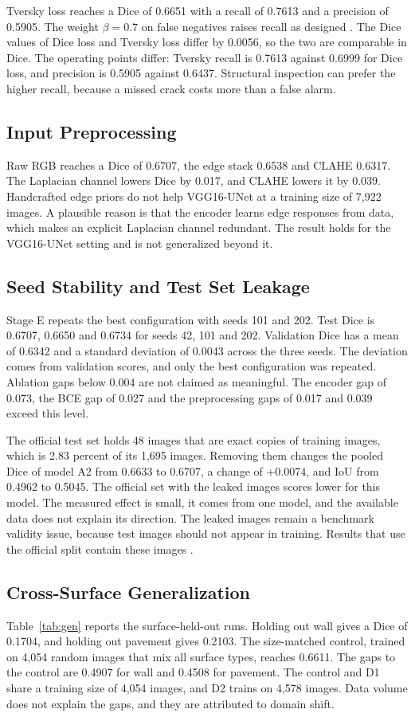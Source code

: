 \documentclass[conference]{IEEEtran}
\begin{document}
Tversky loss reaches a Dice of 0.6651 with a recall of 0.7613 and a precision of 0.5905. The weight $\beta=0.7$ on false negatives raises recall as designed \cite{tversky}. The Dice values of Dice loss and Tversky loss differ by 0.0056, so the two are comparable in Dice. The operating points differ: Tversky recall is 0.7613 against 0.6999 for Dice loss, and precision is 0.5905 against 0.6437. Structural inspection can prefer the higher recall, because a missed crack costs more than a false alarm.

\subsection{Input Preprocessing}
Raw RGB reaches a Dice of 0.6707, the edge stack 0.6538 and CLAHE 0.6317. The Laplacian channel lowers Dice by 0.017, and CLAHE lowers it by 0.039. Handcrafted edge priors do not help VGG16-UNet at a training size of 7,922 images. A plausible reason is that the encoder learns edge responses from data, which makes an explicit Laplacian channel redundant. The result holds for the VGG16-UNet setting and is not generalized beyond it.

\subsection{Seed Stability and Test Set Leakage}
Stage E repeats the best configuration with seeds 101 and 202. Test Dice is 0.6707, 0.6650 and 0.6734 for seeds 42, 101 and 202. Validation Dice has a mean of 0.6342 and a standard deviation of 0.0043 across the three seeds. The deviation comes from validation scores, and only the best configuration was repeated. Ablation gaps below 0.004 are not claimed as meaningful. The encoder gap of 0.073, the BCE gap of 0.027 and the preprocessing gaps of 0.017 and 0.039 exceed this level.

The official test set holds 48 images that are exact copies of training images, which is 2.83 percent of its 1,695 images. Removing them changes the pooled Dice of model A2 from 0.6633 to 0.6707, a change of +0.0074, and IoU from 0.4962 to 0.5045. The official set with the leaked images scores lower for this model. The measured effect is small, it comes from one model, and the available data does not explain its direction. The leaked images remain a benchmark validity issue, because test images should not appear in training. Results that use the official split contain these images \cite{coredeep}.

\subsection{Cross-Surface Generalization}
Table~\ref{tab:gen} reports the surface-held-out runs. Holding out wall gives a Dice of 0.1704, and holding out pavement gives 0.2103. The size-matched control, trained on 4,054 random images that mix all surface types, reaches 0.6611. The gaps to the control are 0.4907 for wall and 0.4508 for pavement. The control and D1 share a training size of 4,054 images, and D2 trains on 4,578 images. Data volume does not explain the gaps, and they are attributed to domain shift.
\end{document}

